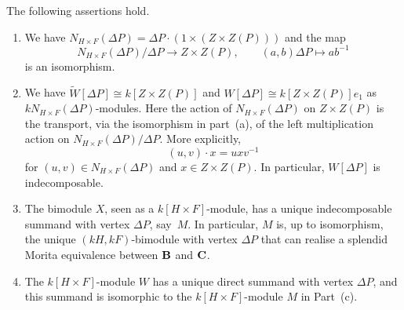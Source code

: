 \begin{lem}\label{lem:candidate_3A6}
The following assertions hold. 
\begin{enumerate}[label=\rm(\alph*)]
    \item We have $N_{H\times F}(\Delta P)=\Delta P\cdot({1}\times (Z\times Z(P)))$ and  the map 
    \[
    N_{H\times F}(\Delta P)/\Delta P\longrightarrow Z\times Z(P), \qquad (a,b)\Delta P\mapsto ab^{-1}
    \]
    is an isomorphism.
    \item  We have $\widetilde{W}[\Delta P]\cong k[Z\times Z(P)]$ and $W[\Delta P]\cong k[Z\times Z(P)]e_1$ as $kN_{H\times F}(\Delta P)$-modules. Here the action of $N_{H\times F}(\Delta P)$ on $Z\times Z(P)$ is the transport, via the isomorphism in part~{\rm (a)}, of the left multiplication action on $N_{H\times F}(\Delta P)/\Delta P$. More explicitly, 
    \[
    (u,v)\cdot x=uxv^{-1}
    \]
    for $(u,v)\in N_{H\times F}(\Delta P)$ and $x\in Z\times Z(P)$.
    In particular, $W[\Delta P]$ is indecomposable.
    \item The bimodule $X$,  seen as a $k[H\times F]$-module, has a unique indecomposable summand with vertex $\Delta P$, say~$M$. In particular, $M$ is, up to isomorphism, the unique $(kH,kF)$-bimodule with vertex $\Delta P$ that can realise a splendid Morita equivalence between ${\mathbf{B}}$ and ${\mathbf{C}}$. 
    \item The $k[H\times F]$-module $W$ has a unique direct summand with vertex $\Delta P$, and this summand is isomorphic to the $k[H\times F]$-module $M$ in Part~{\rm (c)}.
\end{enumerate}
\end{lem}

